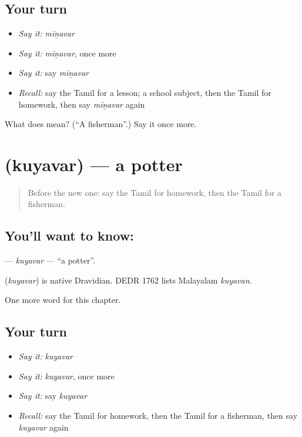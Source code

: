 \subsection*{Your turn}
\begin{itemize}
\raggedright
  \item \emph{Say it:} \emph{mīṉavar}
  \item \emph{Say it:} \emph{mīṉavar}, once more
  \item \emph{Say it:} say \emph{mīṉavar}
  \item \emph{Recall:} say the Tamil for a lesson; a school subject, then the Tamil for homework, then say \emph{mīṉavar} again
\end{itemize}

\begin{tcolorbox}[breakable,colback=teal!4,colframe=teal!35!black,title={Before you move on}]
What does  mean? (\textquotedblleft{}A fisherman\textquotedblright{}.) Say it once more.
\end{tcolorbox}
\section[\texorpdfstring{\ta{குயவர்} (kuyavar)}{குயவர் (kuyavar)}]{ (kuyavar) — a potter}

\label{lesson:TA-C224-kuyavar}



\begin{quote}
Before the new one: say the Tamil for homework, then the Tamil for a fisherman.
\end{quote}

\subsection*{You'll want to know: }
\textbf{} — \emph{kuyavar} — \textquotedblleft{}a potter\textquotedblright{}.

\begin{cousinweb}
\textbf{} (\emph{kuyavar}) is native Dravidian. DEDR 1762 lists Malayalam \emph{kuyavan}.
\end{cousinweb}

\begin{grammarlens}[title={What you've built}]
One more word for this chapter.
\end{grammarlens}

\subsection*{Your turn}
\begin{itemize}
\raggedright
  \item \emph{Say it:} \emph{kuyavar}
  \item \emph{Say it:} \emph{kuyavar}, once more
  \item \emph{Say it:} say \emph{kuyavar}
  \item \emph{Recall:} say the Tamil for homework, then the Tamil for a fisherman, then say \emph{kuyavar} again
\end{itemize}

